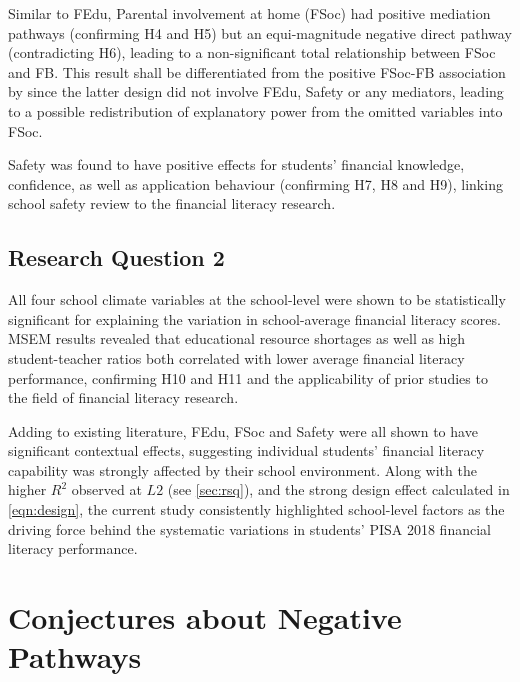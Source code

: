 Similar to FEdu, Parental involvement at home (FSoc) had positive mediation pathways (confirming H4 and H5) but an equi-magnitude negative direct pathway (contradicting H6), leading to a non-significant total relationship between FSoc and FB. This result shall be differentiated from the positive FSoc-FB association by \textcite{morenoherrero:2018a} since the latter design did not involve FEdu, Safety or any mediators, leading to a possible redistribution of explanatory power from the omitted variables into FSoc.

Safety was found to have positive effects for students' financial knowledge, confidence, as well as application behaviour (confirming H7, H8 and H9), linking  school safety review to the financial literacy research.

\subsection{Research Question 2}

All four school climate variables at the school-level were shown to be statistically significant for explaining the variation in school-average financial literacy scores. MSEM results revealed that educational resource shortages as well as high student-teacher ratios both correlated with lower average financial literacy performance, confirming H10 and H11 and the applicability of prior studies \parencite{finn:1999, miles:1998, uline:2008} to the field of financial literacy research.

Adding to existing literature, FEdu, FSoc and Safety were all shown to have significant contextual effects, suggesting individual students' financial literacy capability was strongly affected by their school environment. Along with the higher $R^2$ observed at $L2$ (see \cref{sec:rsq}), and the strong design effect calculated in \cref{eqn:design}, the current study consistently highlighted school-level factors as the driving force behind the systematic variations in students' PISA 2018 financial literacy performance.

\section{Conjectures about Negative Pathways}\label{sec:conj}

